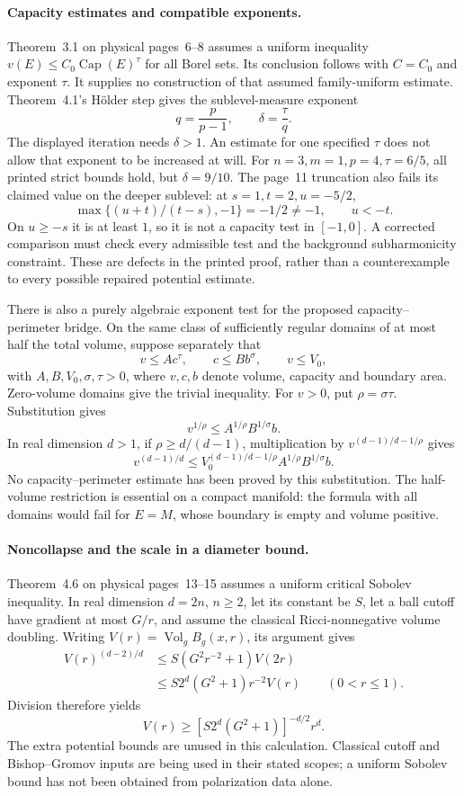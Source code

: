 \paragraph{Capacity estimates and compatible exponents.}
Theorem~3.1 on physical pages~6--8 assumes a uniform inequality
\(v(E)\leq C_0\operatorname{Cap}(E)^\tau\) for all Borel sets.
Its conclusion follows with \(C=C_0\) and exponent \(\tau\).
It supplies no construction of that assumed family-uniform estimate.
Theorem~4.1's H\"older step gives the sublevel-measure exponent
\[
 q=\frac p{p-1},\qquad \delta=\frac{\tau}{q}.
\]
The displayed iteration needs \(\delta>1\).
An estimate for one specified \(\tau\) does not allow that exponent
to be increased at will. For \(n=3,m=1,p=4,\tau=6/5\), all printed
strict bounds hold, but \(\delta=9/10\).
The page~11 truncation also fails its claimed value on the deeper
sublevel: at \(s=1,t=2,u=-5/2\),
\[
 \max\{(u+t)/(t-s),-1\}=-1/2\ne-1,\qquad u<-t.
\]
On \(u\geq-s\) it is at least \(1\), so it is not a capacity test
in \([-1,0]\). A corrected comparison must check every admissible
test and the background subharmonicity constraint.
These are defects in the printed proof, rather than a counterexample
to every possible repaired potential estimate.

There is also a purely algebraic exponent test for the proposed
capacity--perimeter bridge. On the same class of sufficiently regular
domains of at most half the total volume, suppose separately that
\[
 v\leq A c^\tau,\qquad c\leq B b^\sigma,\qquad v\leq V_0,
\]
with \(A,B,V_0,\sigma,\tau>0\), where \(v,c,b\) denote volume,
capacity and boundary area. Zero-volume domains give the trivial
inequality. For \(v>0\), put \(\rho=\sigma\tau\). Substitution gives
\[
 v^{1/\rho}\leq A^{1/\rho}B^{1/\sigma}b.
\]
In real dimension \(d>1\), if \(\rho\geq d/(d-1)\), multiplication
by \(v^{(d-1)/d-1/\rho}\) gives
\[
 v^{(d-1)/d}
 \leq V_0^{(d-1)/d-1/\rho}A^{1/\rho}B^{1/\sigma}b.
\]
No capacity--perimeter estimate has been proved by this substitution.
The half-volume restriction is essential on a compact manifold:
the formula with all domains would fail for \(E=M\), whose boundary
is empty and volume positive.

\paragraph{Noncollapse and the scale in a diameter bound.}
Theorem~4.6 on physical pages~13--15 assumes a uniform critical
Sobolev inequality. In real dimension \(d=2n\), \(n\geq2\), let its
constant be \(S\), let a ball cutoff have gradient at most \(G/r\),
and assume the classical Ricci-nonnegative volume doubling.
Writing \(V(r)=\operatorname{Vol}_g B_g(x,r)\), its argument gives
\[
 \begin{aligned}
 V(r)^{(d-2)/d}
 &\leq S(G^2r^{-2}+1)V(2r)\\
 &\leq S2^d(G^2+1)r^{-2}V(r)\qquad(0<r\leq1).
 \end{aligned}
\]
Division therefore yields
\[
 V(r)\geq [S2^d(G^2+1)]^{-d/2}r^d.
\]
The extra potential bounds are unused in this calculation.
Classical cutoff and Bishop--Gromov inputs are being used in
their stated scopes; a uniform Sobolev bound has not been obtained
from polarization data alone.


